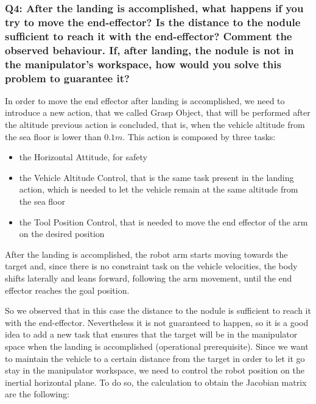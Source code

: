 \documentclass{article}
\begin{document}
\subsubsection{Q4: After the landing is accomplished, what happens if you try to move the end-effector? Is the distance to the nodule sufficient to reach it with the end-effector? Comment the observed behaviour. If, after landing, the nodule is not in the manipulator's workspace, how would you solve this problem to guarantee it?}

In order to move the end effector after landing is accomplished, we need to introduce a new action, that we called Grasp Object, that will be performed after the altitude previous action is concluded, that is, when the vehicle altitude from the sea floor is lower than \(0.1 m\). This action is composed by three tasks: 
\begin{itemize}
	\item the Horizontal Attitude, for safety
	\item the Vehicle Altitude Control, that is the same task present in the landing action, which is needed to let the vehicle remain at the same altitude from the sea floor
	\item the Tool Position Control, that is needed to move the end effector of the arm on the desired position
\end{itemize}
After the landing is accomplished, the robot arm starts moving towards the target and, since there is no constraint task on the vehicle velocities, the body shifts laterally and leans forward, following the arm movement, until the end effector reaches the goal position.

\begin{figure}[H]
	\centering
	\hspace{10mm}
	\label{im:v_land_grasp}
\end{figure} 
So we observed that in this case the distance to the nodule is sufficient to reach it with the end-effector. Nevertheless it is not guaranteed to happen, so it is a good idea to add a new task that ensures that the target will be in the manipulator space when the landing is accomplished (operational prerequisite).
Since we want to maintain the vehicle to a certain distance from the target in order to let it go stay in the manipulator workspace, we need to control the robot position on the inertial horizontal plane. To do so, the calculation to obtain the Jacobian matrix are the following:
\end{document}

